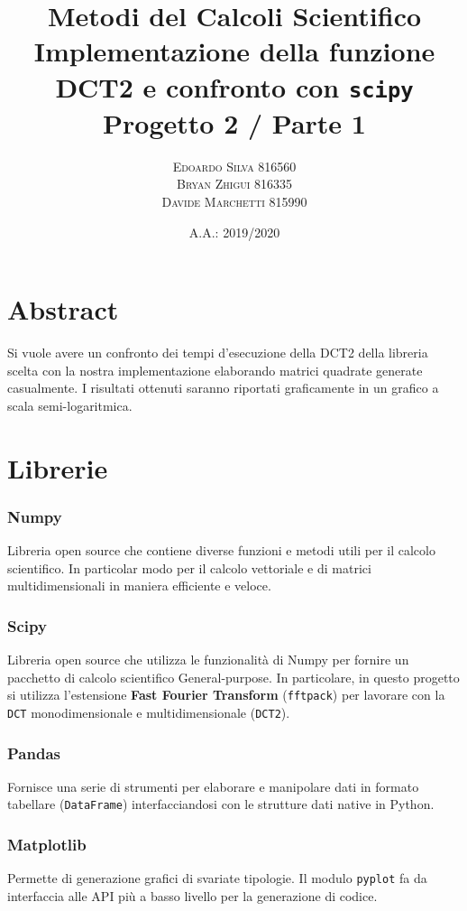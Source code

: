 \documentclass[11pt,italian]{article}
\title{
    Metodi del Calcoli Scientifico \\
    \normalsize Implementazione della funzione DCT2 e confronto con \lstinline{scipy} \\
	\normalsize Progetto 2 / Parte 1
}
\date{A.A.: 2019/2020}
\author{
	\normalsize
	\textsc{Edoardo Silva 816560} \\
	\normalsize
	\textsc{Bryan Zhigui 816335} \\
	\normalsize
	\textsc{Davide Marchetti 815990}
}
\begin{document}
\maketitle

\section*{Abstract}
Si vuole avere un confronto dei tempi d'esecuzione della DCT2 della libreria scelta con la nostra implementazione elaborando matrici quadrate generate casualmente.
I risultati ottenuti saranno riportati graficamente in un grafico a scala semi-logaritmica.

\newpage
\section{Librerie}
\subsubsection*{Numpy}
Libreria open source che contiene diverse funzioni e metodi utili per il calcolo scientifico. In particolar modo per il calcolo vettoriale e di matrici multidimensionali in maniera efficiente e veloce.

\subsubsection*{Scipy}
Libreria open source che utilizza le funzionalità di Numpy per fornire un pacchetto di calcolo scientifico General-purpose. In particolare, in questo progetto si utilizza l'estensione \textbf{Fast Fourier Transform} (\lstinline{fftpack}) per lavorare con la \lstinline{DCT} monodimensionale e multidimensionale (\lstinline{DCT2}).

\subsubsection*{Pandas}
Fornisce una serie di strumenti per elaborare e manipolare dati in formato tabellare (\lstinline{DataFrame}) interfacciandosi con le strutture dati native in Python.

\subsubsection*{Matplotlib}
Permette di generazione grafici di svariate tipologie.
Il modulo \lstinline{pyplot} fa da interfaccia alle API più a basso livello per la generazione di codice.
\end{document}
